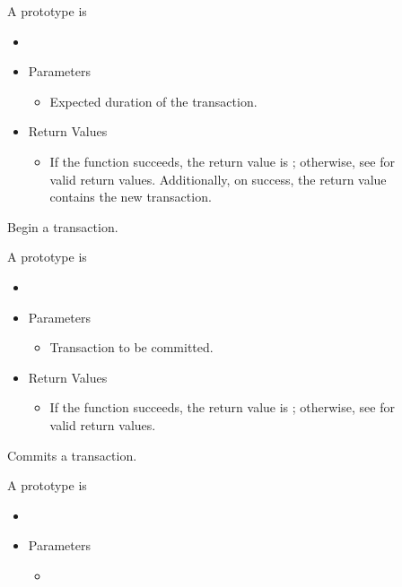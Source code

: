 \begin{description}
\item []
  A prototype is
  
  \begin{itemize}
    \item[] 
    \item[] Parameters
    \begin{itemize}
      \item[] 

      Expected duration of the transaction.
    \end{itemize}
    \item[] Return Values
    \begin{itemize}
      \item[] If the function succeeds, the return value is ; 
      otherwise, see  for valid return values. Additionally,
      on success, the return value contains the new transaction.
    \end{itemize}
  \end{itemize}    
  
  Begin a transaction.
\item []
  A prototype is

  \begin{itemize}
    \item[] 
    \item[] Parameters
    \begin{itemize}
      \item[] 

      Transaction to be committed.
    \end{itemize}
    \item[] Return Values
    \begin{itemize}
      \item[] If the function succeeds, the return value is ; 
      otherwise, see  for valid return values. 
    \end{itemize}
  \end{itemize}  

  Commits a transaction.
\item []
  A prototype is

  \begin{itemize}
    \item[] 
    \item[] Parameters
    \begin{itemize}
      \item[] 


\end{itemize}
\end{itemize}
\end{description}
